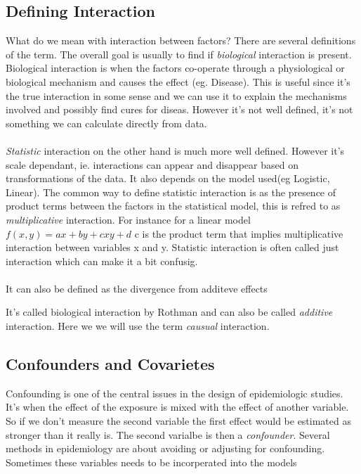 \documentclass[10pt,a4paper]{article}
\begin{document}
\subsection{Defining Interaction}
What do we mean with interaction between factors? There are several definitions of the term\cite{rothman2002intro_epidemiology}. The overall goal is usually to find if \emph{biological} interaction is present. Biological interaction is when the factors co-operate through a physiological or biological mechanism and causes the effect (eg. Disease). This is useful since it's the true interaction in some sense and we can use it to explain the mechanisms involved and possibly find cures for diseas. However it's not well defined, it's not something we can calculate directly from data.\cite{rothman1998modern,rothman2002intro_epidemiology}\\
\\
\emph{Statistic} interaction on the other hand is much more well defined. However it's scale dependant, ie. interactions can appear and disappear based on transformations of the data. It also depends on the model used(eg Logistic, Linear). The common way to define statistic interaction is as the presence of product terms between the factors in the statistical model, this is refred to as \emph{multiplicative} interaction. For instance for a linear model $f(x,y)=ax+by+cxy+d$ c is the product term that implies multiplicative interaction between variables x and y. Statistic interaction is often called just interaction which can make it a  bit confusig.\cite{geira,rothman1998modern}\\
\\
It can also be defined as the divergence from additeve effects

It's called biological interaction by Rothman\cite{} and can also be called \emph{additive} interaction\cite{geira}. Here we we will use the term \emph{causual} interaction.\\


\subsection{Confounders and Covarietes}
Confounding is one of the central issues in the design of epidemiologic studies. It's when the effect of the exposure is mixed with the effect of another variable. So if we don't measure the second variable the first effect would be estimated as stronger than it really is. The second varialbe is then a \emph{confounder}. Several methods in epidemiology are about avoiding or adjusting for confounding. Sometimes these variables needs to be incorperated into the models \cite{rothman2002intro_epidemiology}
\end{document}
